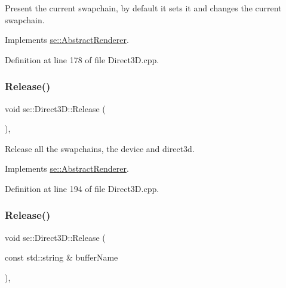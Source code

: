 Present the current swapchain, by default it sets it and changes the current swapchain. 

Implements \mbox{\hyperlink{classse_1_1_abstract_renderer_a5102e4df9100f6c0df9c26beaca6c4e4}{se\+::\+Abstract\+Renderer}}.



Definition at line 178 of file Direct3\+D.\+cpp.

\mbox{\label{classse_1_1_direct3_d_ae2979f16a5c35773cf2c243d8e6f90e4}} 
\subsubsection{\texorpdfstring{Release()}{Release()}\hspace{0.1cm}{\footnotesize\ttfamily [1/2]}}
{\footnotesize\ttfamily void se\+::\+Direct3\+D\+::\+Release (\begin{DoxyParamCaption}{ }\end{DoxyParamCaption})\hspace{0.3cm}{\ttfamily [override]}, {\ttfamily [virtual]}}

Release all the swapchains, the device and direct3d. 

Implements \mbox{\hyperlink{classse_1_1_abstract_renderer_a98e35b7db62827580573185ed91b25bb}{se\+::\+Abstract\+Renderer}}.



Definition at line 194 of file Direct3\+D.\+cpp.

\mbox{\label{classse_1_1_direct3_d_a77f814cda45f2b490e11c522f8e752e3}} 
\subsubsection{\texorpdfstring{Release()}{Release()}\hspace{0.1cm}{\footnotesize\ttfamily [2/2]}}
{\footnotesize\ttfamily void se\+::\+Direct3\+D\+::\+Release (\begin{DoxyParamCaption}\item[{const std\+::string \&}]{buffer\+Name }\end{DoxyParamCaption})\hspace{0.3cm}{\ttfamily [override]}, {\ttfamily [virtual]}}

